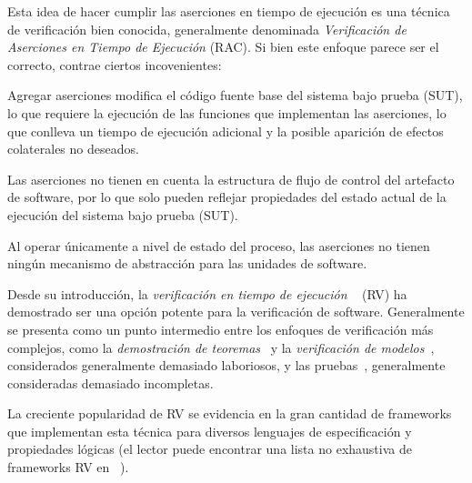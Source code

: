 Esta idea de hacer cumplir las aserciones en tiempo de ejecución es una técnica de verificación bien conocida, generalmente denominada \emph{Verificación de Aserciones en Tiempo de Ejecución} (RAC).
%
Si bien este enfoque parece ser el correcto, contrae ciertos incovenientes:
\begin{inparaenum}[1)]
\item \label{incoveniente 1} Agregar aserciones modifica el código fuente base del sistema bajo prueba (SUT), lo que requiere la ejecución de las funciones que implementan las aserciones, lo que conlleva un tiempo de ejecución adicional y la posible aparición de efectos colaterales no deseados.
\item \label{incoveniente 2} Las aserciones no tienen en cuenta la estructura de flujo de control del artefacto de software, por lo que solo pueden reflejar propiedades del estado actual de la ejecución del sistema bajo prueba (SUT).
\item \label{incoveniente 3} Al operar únicamente a nivel de estado del proceso, las aserciones no tienen ningún mecanismo de abstracción para las unidades de software.
\end{inparaenum}

Desde su introducción, la \emph{verificación en tiempo de ejecución} ~\cite{rv01} (RV) ha demostrado ser una opción potente para la verificación de software. Generalmente se presenta como un punto intermedio entre los enfoques de verificación más complejos, como la \emph{demostración de teoremas}~\cite{owre:cav96,nipkow02,bertot04} y la \emph{verificación de modelos}~\cite{clarke00}, considerados generalmente demasiado laboriosos, y las pruebas~\cite{pezze07}, generalmente consideradas demasiado incompletas.

La creciente popularidad de RV se evidencia en la gran cantidad de frameworks que implementan esta técnica para diversos lenguajes de especificación y propiedades lógicas (el lector puede encontrar una lista no exhaustiva de frameworks RV en ~\cite[Fig.~5]{leucker:setss16}).

